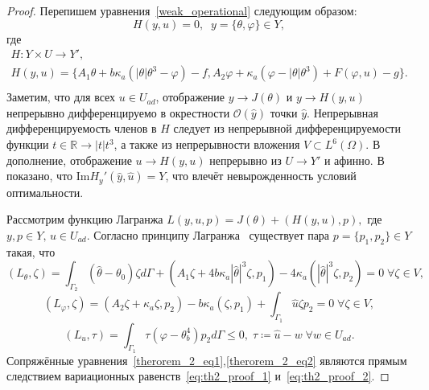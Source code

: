 \begin{proof}
    Перепишем уравнения~\eqref{weak_operational} следующим образом:
    \[ H(y,u) = 0,\;\; y = \{\theta,\varphi\} \in Y, \]
    где
    \begin{gather*}
        H:Y \times U \to Y',\\
        H(y,u) =\{A_1 \theta + b \kappa_a (| \theta | \theta^3 - \varphi ) - f,
        A_2 \varphi + \kappa_a (\varphi - |\theta|\theta^3) + F(\varphi, u) - g \}.\\
    \end{gather*}
    Заметим, что для всех $u \in U_{ad}$, отображение $y \to J(\theta) $ и $y \to H(y,u)$ непрерывно
    дифференцируемо в окрестности $\mathcal{O}(\hat{y})$ точки $\hat{y}$.
    Непрерывная дифференцируемость членов в $H$ следует из непрерывной дифференцируемости
    функции $t \in \mathbb{R} \to | t | t^3$, а также из непрерывности вложения  $V \subset L^6(\Omega)$.
    В дополнение, отображение $u \to H(y,u)$ непрерывно из $U \to Y'$ и афинно.
    В~\cite{cheb_origin} показано, что $\text{Im}H_y'(\hat{y}, \hat{u}) = Y$,
    что влечёт невырожденность условий оптимальности.

    Рассмотрим функцию Лагранжа $L(y,u,p) = J(\theta) + (H(y,u),p),$ где $y,p \in Y,\, u \in U_{ad}$.
    Согласно принципу Лагранжа~\cite[Гл.2, Теорема 1.5]{theorem_proof_18} существует пара $p = \{p_1,p_2\} \in Y$ такая, что
    \begin{equation}
        \label{eq:th2_proof_1}
        (L_\theta,\zeta) =\int_{\Gamma_2}(\hat\theta -\theta_0) \zeta d\Gamma
        + (A_1 \zeta + 4b\kappa_a |\hat\theta|^3 \zeta,p_1)
        - 4\kappa_a(|\hat\theta|^3 \zeta,p_2) = 0 \; \forall \zeta \in V,
    \end{equation}
    \begin{equation}
        \label{eq:th2_proof_2}
        (L_\varphi, \zeta) = (A_2 \zeta + \kappa_a \zeta, p_2)
        - b \kappa_a(\zeta,p_1) +\int_{\Gamma_1} \hat u \zeta p_2 = 0 \; \forall \zeta \in V,
    \end{equation}
    \begin{equation}
        \label{eq:th2_proof_3}
        (L_u,\tau) = \int_{\Gamma_1} \tau (\varphi - \theta^4_b) p_2 d\Gamma  \leq 0,
        \; \tau \coloneqq \hat u - w \; \forall w \in U_{ad}.
    \end{equation}
    Сопряжённые уравнения~\eqref{therorem_2_eq1},\eqref{therorem_2_eq2} являются прямым следствием
    вариационных равенств~\eqref{eq:th2_proof_1} и~\eqref{eq:th2_proof_2}.
\end{proof}


\FloatBarrier
